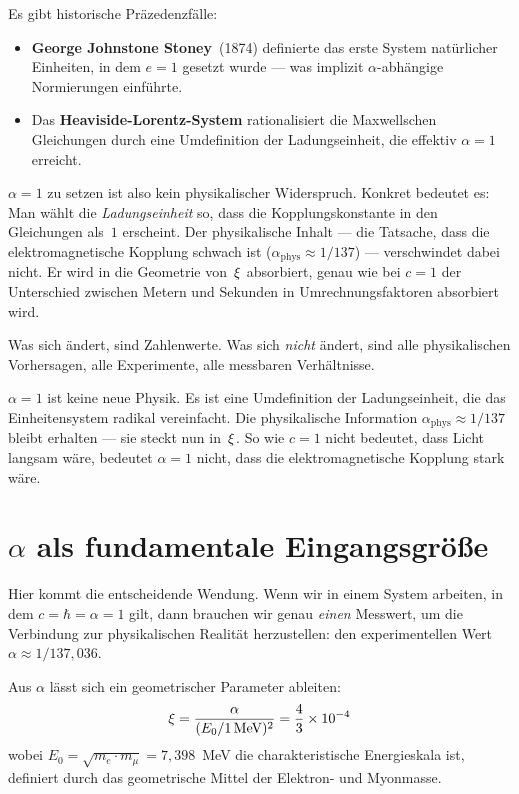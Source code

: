 Es gibt historische Präzedenzfälle:

\begin{itemize}
\item \textbf{George Johnstone Stoney}~(1874) definierte das erste System natürlicher Einheiten, in dem $e = 1$ gesetzt wurde --- was implizit $\alpha$-abhängige Normierungen einführte.
\item Das \textbf{Heaviside-Lorentz-System} rationalisiert die Maxwellschen Gleichungen durch eine Umdefinition der Ladungseinheit, die effektiv $\alpha = 1$ erreicht.
\end{itemize}

$\alpha = 1$ zu setzen ist also kein physikalischer Widerspruch. Konkret bedeutet es: Man wählt die \emph{Ladungseinheit} so, dass die Kopplungskonstante in den Gleichungen als~$1$ erscheint. Der physikalische Inhalt --- die Tatsache, dass die elektromagnetische Kopplung schwach ist ($\alpha_{\text{phys}} \approx 1/137$) --- verschwindet dabei nicht. Er wird in die Geometrie von~$\xi$ absorbiert, genau wie bei $c = 1$ der Unterschied zwischen Metern und Sekunden in Umrechnungsfaktoren absorbiert wird.

Was sich ändert, sind Zahlenwerte. Was sich \emph{nicht} ändert, sind alle physikalischen Vorhersagen, alle Experimente, alle messbaren Verhältnisse.

\begin{kerngedanke}
$\alpha = 1$ ist keine neue Physik. Es ist eine Umdefinition der Ladungseinheit, die das Einheitensystem radikal vereinfacht. Die physikalische Information $\alpha_{\text{phys}} \approx 1/137$ bleibt erhalten --- sie steckt nun in~$\xi$. So wie $c = 1$ nicht bedeutet, dass Licht langsam wäre, bedeutet $\alpha = 1$ nicht, dass die elektromagnetische Kopplung stark wäre.
\end{kerngedanke}

\section{$\alpha$ als fundamentale Eingangsgröße}

Hier kommt die entscheidende Wendung. Wenn wir in einem System arbeiten, in dem $c = \hbar = \alpha = 1$ gilt, dann brauchen wir genau \emph{einen} Messwert, um die Verbindung zur physikalischen Realität herzustellen: den experimentellen Wert $\alpha \approx 1/137{,}036$.

Aus $\alpha$ lässt sich ein geometrischer Parameter ableiten:
\begin{equation}
\xi = \frac{\alpha}{(E_0/1\,\text{MeV})^2} = \frac{4}{3} \times 10^{-4}
\end{equation}
wobei $E_0 = \sqrt{m_e \cdot m_\mu} = 7{,}398$~MeV die charakteristische Energieskala ist, definiert durch das geometrische Mittel der Elektron- und Myonmasse.

